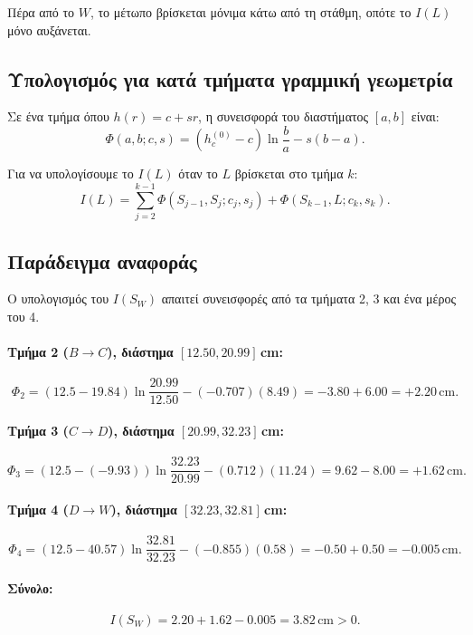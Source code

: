\documentclass[11pt]{article}
\begin{document}
Πέρα από το $W$, το μέτωπο βρίσκεται μόνιμα κάτω από τη στάθμη, οπότε το $I(L)$ μόνο αυξάνεται.

\subsection{Υπολογισμός για κατά τμήματα γραμμική γεωμετρία}

Σε ένα τμήμα όπου $h(r) = c + sr$, η συνεισφορά του διαστήματος $[a, b]$ είναι:
\begin{equation}
  \Phi(a, b; c, s) = (h_c^{(0)} - c) \ln\frac{b}{a} - s(b - a).
  \label{eq:Phi-def}
\end{equation}

Για να υπολογίσουμε το $I(L)$ όταν το $L$ βρίσκεται στο τμήμα $k$:
\begin{equation}
  I(L) = \sum_{j=2}^{k-1} \Phi(S_{j-1}, S_j; c_j, s_j) + \Phi(S_{k-1}, L; c_k, s_k).
  \label{eq:I-piecewise}
\end{equation}

\subsection{Παράδειγμα αναφοράς}

Ο υπολογισμός του $I(S_W)$ απαιτεί συνεισφορές από τα τμήματα 2, 3 και ένα μέρος του 4.

\paragraph{Τμήμα 2 ($B \to C$), διάστημα $[12.50, 20.99]$\,cm:}
\[
  \Phi_2 = (12.5 - 19.84)\ln\frac{20.99}{12.50} - (-0.707)(8.49) = -3.80 + 6.00 = +2.20\,\text{cm}.
\]

\paragraph{Τμήμα 3 ($C \to D$), διάστημα $[20.99, 32.23]$\,cm:}
\[
  \Phi_3 = (12.5 - (-9.93))\ln\frac{32.23}{20.99} - (0.712)(11.24) = 9.62 - 8.00 = +1.62\,\text{cm}.
\]

\paragraph{Τμήμα 4 ($D \to W$), διάστημα $[32.23, 32.81]$\,cm:}
\[
  \Phi_4 = (12.5 - 40.57)\ln\frac{32.81}{32.23} - (-0.855)(0.58) = -0.50 + 0.50 = -0.005\,\text{cm}.
\]

\paragraph{Σύνολο:}
\begin{equation}
  I(S_W) = 2.20 + 1.62 - 0.005 = 3.82\,\text{cm} > 0.
  \label{eq:I-SW-value}
\end{equation}
\end{document}
